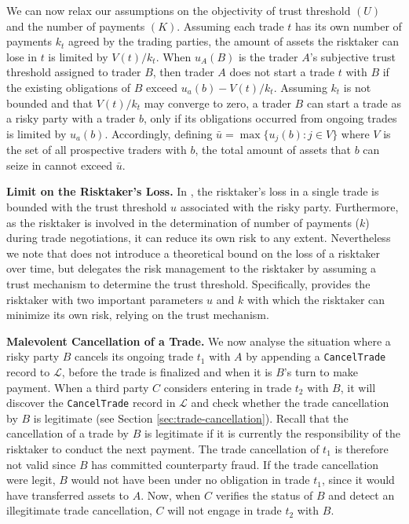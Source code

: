 We can now relax our assumptions on the objectivity of trust threshold $ (U) $ and the number of payments $ (K) $.
Assuming each trade $ t $ has its own number of payments $ k_t $ agreed by the trading parties, the amount of assets the risktaker can lose in $ t $ is limited by $ V(t)/k_t $.
When $ u_A(B) $ is the trader $ A $'s subjective trust threshold assigned to trader $ B $, then trader $ A $ does not start a trade $ t $ with $ B $ if the existing obligations of $ B $ exceed $ u_a(b) - V(t)/k_t $.
Assuming $ k_t $ is not bounded and that $ V(t)/k_t $ may converge to zero, a trader $ B $ can start a trade as a risky party with a trader $ b $, only if its obligations occurred from ongoing trades is limited by $ u_a(b) $.
Accordingly, defining $ \bar{u} = \max\{u_j(b) : j\in V\} $ where $ V $ is the set of all prospective traders with $ b $, the total amount of assets that $ b $ can seize in \ModelName{} cannot exceed $ \bar{u} $.

\textbf{Limit on the Risktaker's Loss.} 
In \ModelName{}, the risktaker's loss in a single trade is bounded with the trust threshold $ u $ associated with the risky party.
Furthermore, as the risktaker is involved in the determination of number of payments ($ k $) during trade negotiations, it can reduce its own risk to any extent.
Nevertheless we note that \ModelName{} does not introduce a theoretical bound on the loss of a risktaker over time, but delegates the risk management to the risktaker by assuming a trust mechanism to determine the trust threshold.
Specifically, \ModelName{} provides the risktaker with two important parameters $ u $ and $ k $ with which the risktaker can minimize its own risk, relying on the trust mechanism.

\textbf{Malevolent Cancellation of a Trade.} 
We now analyse the situation where a risky party $ B $ cancels its ongoing trade $ t_1 $ with $ A $ by appending a \texttt{CancelTrade} record to $ \mathcal{L} $, before the trade is finalized and when it is $ B $'s turn to make payment.
When a third party $ C $ considers entering in trade $ t_2 $ with $ B $, it will discover the \texttt{CancelTrade} record in $ \mathcal{L} $ and check whether the trade cancellation by $ B $ is legitimate (see Section \ref{sec:trade-cancellation}).
Recall that the cancellation of a trade by $ B $ is legitimate if it is currently the responsibility of the risktaker to conduct the next payment.
The trade cancellation of $ t_1 $ is therefore not valid since $ B $ has committed counterparty fraud.
If the trade cancellation were legit, $ B $ would not have been under no obligation in trade $ t_1 $, since it would have transferred assets to $ A $.
Now, when $ C $ verifies the status of $ B $ and detect an illegitimate trade cancellation, $ C $ will not engage in trade $ t_2 $ with $ B $.

